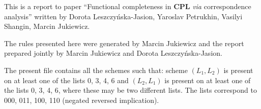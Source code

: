 \documentclass[11pt]{article}
\begin{document}
	
	This is a report to paper ``Functional completeness in \textbf{CPL} \textit{via} correspondence analysis'' written by Dorota Leszczy\'{n}ska-Jasion, Yaroslav Petrukhin, Vasilyi Shangin, Marcin Jukiewicz. 
	
	The rules presented here were generated by Marcin Jukiewicz and the report prepared jointly by Marcin Jukiewicz and Dorota Leszczy\'{n}ska-Jasion.
	
	The present file contains all the schemes such that: scheme $(L_1, L_2)$ is present on at least one of the lists 0, 3, 4, 6 and $(L_2, L_1)$ is present on at least one of the lists 0, 3, 4, 6, where these may be two different lists. The lists correspond to 000, 011, 100, 110 (negated reversed implication).
	
	\bigskip
	
\begin{center}


\end{center}
\end{document}
